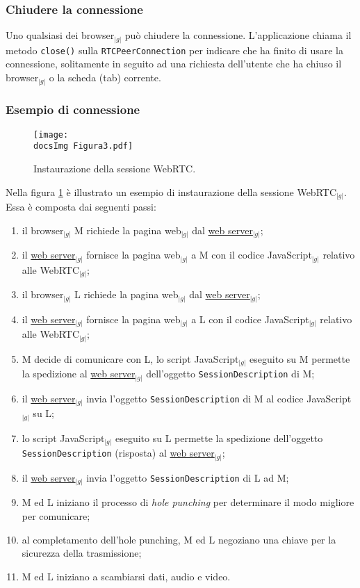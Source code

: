 {{		\subsubsection{Chiudere la connessione}{
			Uno qualsiasi dei browser$_{|g|}$ può chiudere la connessione. L’applicazione chiama il metodo \texttt{close()} 
			sulla \texttt{RTCPeerConnection} per indicare che ha finito di usare la connessione, solitamente in seguito 
			ad una richiesta dell’utente che ha chiuso il browser$_{|g|}$ o la scheda (tab) corrente.
		}
		
		\subsubsection{Esempio di connessione}{
			\begin{center}
				\begin{figure}[h]
					\centering
					\label{fig:figura3}
					\texttt{[image: \\docsImg Figura3.pdf]}
				\caption{Instaurazione della sessione WebRTC\g .}	
				\end{figure}
			\end{center}
			Nella figura \ref{fig:figura3} è illustrato un esempio di instaurazione della sessione WebRTC$_{|g|}$.
			Essa è composta dai seguenti passi:
			\begin{enumerate}
				\item il browser$_{|g|}$ M richiede la pagina web$_{|g|}$ dal \underline{web server}$_{|g|}$;
				\item il \underline{web server}$_{|g|}$ fornisce la pagina web$_{|g|}$ a M con il codice 
				      JavaScript$_{|g|}$ relativo alle WebRTC$_{|g|}$;
				\item il browser$_{|g|}$ L richiede la pagina web$_{|g|}$ dal \underline{web server}$_{|g|}$;
				\item il \underline{web server}$_{|g|}$ fornisce la pagina web$_{|g|}$ a L con il codice 
				      JavaScript$_{|g|}$ relativo alle WebRTC$_{|g|}$;
				\item M decide di comunicare con L, lo script JavaScript$_{|g|}$ eseguito su M permette la spedizione 
				      al \underline{web server}$_{|g|}$ dell’oggetto \texttt{SessionDescription} di M;
				\item il \underline{web server}$_{|g|}$ invia l’oggetto \texttt{SessionDescription} di M al codice 
				      JavaScript$_{|g|}$ su L;
				\item lo script JavaScript$_{|g|}$ eseguito su L permette la spedizione dell’oggetto 
				      \texttt{SessionDescription} (risposta) al \underline{web server}$_{|g|}$;
				\item il \underline{web server}$_{|g|}$ invia l’oggetto \texttt{SessionDescription} di L ad M;
				\item M ed L iniziano il processo di \emph{hole punching} per determinare il modo migliore per comunicare;
				\item al completamento dell’hole punching, M ed L negoziano una chiave per la sicurezza della trasmissione;
				\item M ed L iniziano a scambiarsi dati, audio e video.
			\end{enumerate}
		}
	}
}
